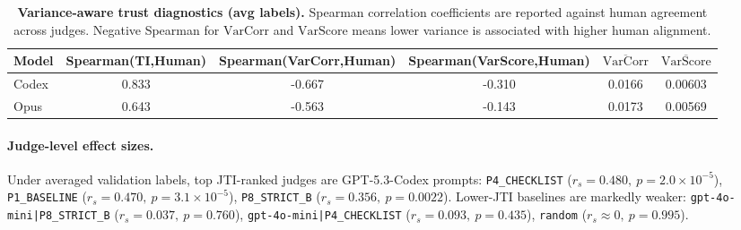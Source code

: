 \documentclass{article}
\begin{document}
\begin{table}[t]
  \centering
  \small
  \begin{tabular}{lccccc}
    \toprule
    \textbf{Model} & \textbf{Spearman(TI,Human)} & \textbf{Spearman(VarCorr,Human)} & \textbf{Spearman(VarScore,Human)} & \(\mathbf{\overline{\mathrm{VarCorr}}}\) & \(\mathbf{\overline{\mathrm{VarScore}}}\) \\
    \midrule
    Codex          & 0.833                       & -0.667                           & -0.310                            & 0.0166                                   & 0.00603                                   \\
    Opus           & 0.643                       & -0.563                           & -0.143                            & 0.0173                                   & 0.00569                                   \\
    \bottomrule
  \end{tabular}
  \caption{\textbf{Variance-aware trust diagnostics (avg labels).}
    Spearman correlation coefficients are reported against human agreement across judges.
    Negative Spearman for \(\mathrm{VarCorr}\) and \(\mathrm{VarScore}\) means lower variance is associated with higher human alignment.}
  \label{tab:variance_aware_trust}
\end{table}

\paragraph{Judge-level effect sizes.}
Under averaged validation labels, top JTI-ranked judges are GPT-5.3-Codex prompts:
\texttt{P4\_CHECKLIST} (\(r_s=0.480,\ p=2.0\times10^{-5}\)),
\texttt{P1\_BASELINE} (\(r_s=0.470,\ p=3.1\times10^{-5}\)),
\texttt{P8\_STRICT\_B} (\(r_s=0.356,\ p=0.0022\)).
Lower-JTI baselines are markedly weaker:
\texttt{gpt-4o-mini|P8\_STRICT\_B} (\(r_s=0.037,\ p=0.760\)),
\texttt{gpt-4o-mini|P4\_CHECKLIST} (\(r_s=0.093,\ p=0.435\)),
\texttt{random} (\(r_s\approx0,\ p=0.995\)).
\end{document}
